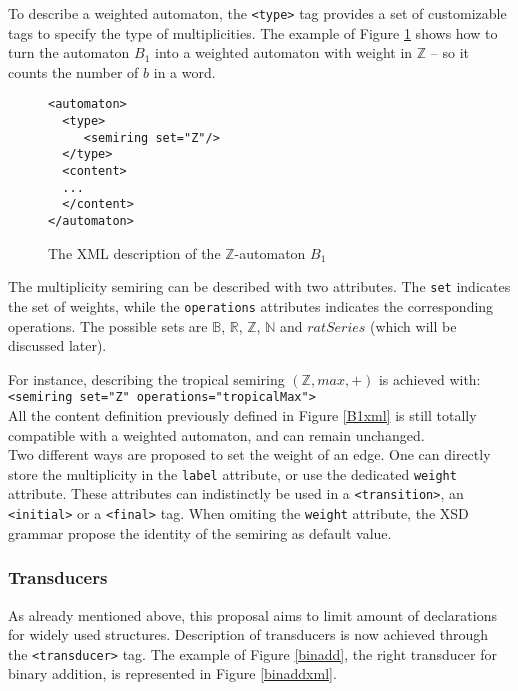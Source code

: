 \documentclass[a4paper]{llncs}
\begin{document}
To describe a weighted automaton, the \verb|<type>| tag provides a set
of customizable tags to specify the type of multiplicities. The example
of Figure \ref{B1Zxml} shows how to turn the automaton $B_1$ into a
weighted automaton with weight in ${\mathbb Z}$ -- so it counts the
number of $b$ in a word.

{\small

\begin{figure}[h]
  \begin{center}
\begin{verbatim}
<automaton>
  <type>
     <semiring set="Z"/>
  </type>
  <content>
  ...
  </content>
</automaton>
\end{verbatim}

\caption{The XML description of the $\mathbb{Z}$-automaton $B_1$}
\label{B1Zxml}
  \end{center}
\end{figure}

}

The multiplicity semiring can be described with two attributes. The
\verb|set| indicates the set of weights, while the \verb|operations|
attributes indicates the corresponding operations. The possible sets
are ${\mathbb B}$, ${\mathbb R}$, ${\mathbb Z}$, ${\mathbb N}$ and
$ratSeries$ (which will be discussed later). 

For instance, describing the tropical semiring $({\mathbb Z}, max, +)$
is achieved with: {\small
\verb|<semiring set="Z" operations="tropicalMax">|}\\


All the content definition previously defined in Figure \ref{B1xml} is
still totally compatible with a weighted automaton, and can remain
unchanged. \\

Two different ways are proposed to set the weight of an edge. One can
directly store the multiplicity in the \verb|label| attribute, or use
the dedicated \verb|weight| attribute. These attributes can
indistinctly be used in a \verb|<transition>|, an
\verb|<initial>| or a \verb|<final>| tag. When omiting the
\verb|weight| attribute, the XSD grammar propose the identity of
the semiring as default value.

%
\subsubsection{Transducers}

As already mentioned above, this proposal aims to limit amount of
declarations for widely used structures. Description of transducers is
now achieved through the \verb|<transducer>| tag. The example of
Figure \ref{binadd}, the right transducer for binary addition, is
represented in Figure \ref{binaddxml}. 
\end{document}
